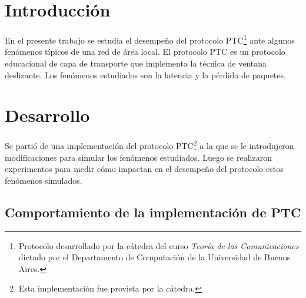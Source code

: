 \documentclass[a4paper, 10pt, twoside]{article}
\begin{document}
\newpage




\tableofcontents

\newpage




\section{Introducción}
\label{sec:introduccion}


En el presente trabajo se estudia el desempeño del protocolo PTC\footnote{Protocolo desarrollado por la cátedra del curso \textit{Teoría de las Comunicaciones} dictado por el Departamento de Computación de la Universidad de Buenos Aires.} ante algunos fenómenos típicos de una red de área local. El protocolo PTC es un protocolo educacional de capa de transporte que implementa la técnica de ventana deslizante. Los fenómenos estudiados son la latencia y la pérdida de paquetes.




\section{Desarrollo}
\label{sec:desarrollo}

Se partió de una implementación del protocolo PTC\footnote{Esta implementación fue provista por la cátedra.} a la que se le introdujeron modificaciones para simular los fenómenos estudiados. Luego se realizaron experimentos para medir cómo impactan en el desempeño del protocolo estos fenómenos simulados.


\subsection{Comportamiento de la implementación de PTC}
\end{document}
